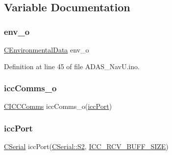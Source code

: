 \subsection{Variable Documentation}
\mbox{\label{_a_d_a_s___nav_u_8ino_a6c839a9b171c9b833a61a0d7612e2da8}} 
\subsubsection{\texorpdfstring{env\+\_\+o}{env\_o}}
{\footnotesize\ttfamily \mbox{\hyperlink{class_c_environmental_data}{C\+Environmental\+Data}} env\+\_\+o}



Definition at line 45 of file A\+D\+A\+S\+\_\+\+Nav\+U.\+ino.

\mbox{\label{_a_d_a_s___nav_u_8ino_a62ef6b3308259edb69af585549178324}} 
\subsubsection{\texorpdfstring{icc\+Comms\+\_\+o}{iccComms\_o}}
{\footnotesize\ttfamily \mbox{\hyperlink{class_c_i_c_c_comms}{C\+I\+C\+C\+Comms}} icc\+Comms\+\_\+o(\mbox{\hyperlink{_a_d_a_s___nav_u_8ino_ad1e6d9fed4369104e412a46c019634d2}{icc\+Port}})}

\mbox{\label{_a_d_a_s___nav_u_8ino_ad1e6d9fed4369104e412a46c019634d2}} 
\subsubsection{\texorpdfstring{icc\+Port}{iccPort}}
{\footnotesize\ttfamily \mbox{\hyperlink{class_c_serial}{C\+Serial}} icc\+Port(\mbox{\hyperlink{class_c_serial_a000039540cc90b18bafacf5744e7eda2a8cc95f4591147b0df028e003f82220a1}{C\+Serial\+::\+S2}}, \mbox{\hyperlink{_a_d_a_s___cfg_8h_abf41bed56ee0b2a8858687c4420bb110}{I\+C\+C\+\_\+\+R\+C\+V\+\_\+\+B\+U\+F\+F\+\_\+\+S\+I\+ZE}})}

